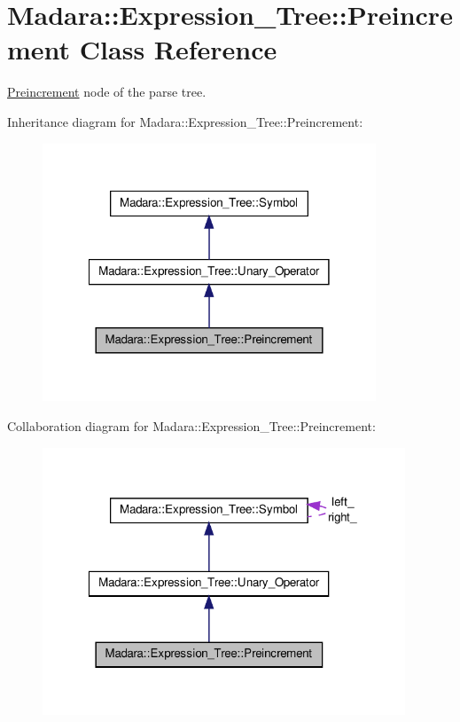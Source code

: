 \hypertarget{classMadara_1_1Expression__Tree_1_1Preincrement}{
\section{Madara::Expression\_\-Tree::Preincrement Class Reference}
\label{d5/d34/classMadara_1_1Expression__Tree_1_1Preincrement}
}


\hyperlink{classMadara_1_1Expression__Tree_1_1Preincrement}{Preincrement} node of the parse tree.  




Inheritance diagram for Madara::Expression\_\-Tree::Preincrement:
\nopagebreak
\begin{figure}[H]
\begin{center}
\leavevmode
\includegraphics[width=282pt]{d9/d46/classMadara_1_1Expression__Tree_1_1Preincrement__inherit__graph}
\end{center}
\end{figure}


Collaboration diagram for Madara::Expression\_\-Tree::Preincrement:
\nopagebreak
\begin{figure}[H]
\begin{center}
\leavevmode
\includegraphics[width=307pt]{dc/ddb/classMadara_1_1Expression__Tree_1_1Preincrement__coll__graph}
\end{center}
\end{figure}
